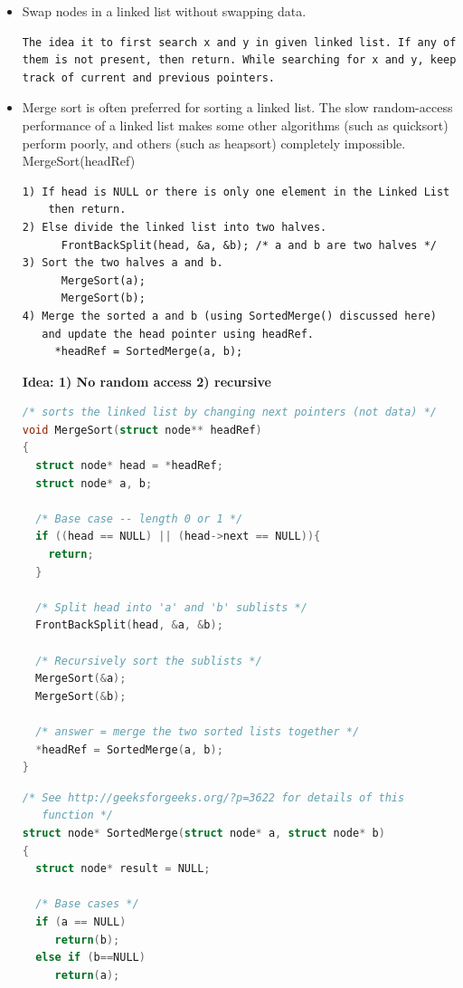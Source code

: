 \documentclass[a4paper,11pt,twoside]{book}
\begin{document}
\begin{itemize}
	\item Swap nodes in a linked list without swapping data. 
\begin{lstlisting}[breaklines]
The idea it to first search x and y in given linked list. If any of them is not present, then return. While searching for x and y, keep track of current and previous pointers.
\end{lstlisting}


	\item Merge sort is often preferred for sorting a linked list. The slow random-access performance of a linked list makes some other algorithms (such as quicksort) perform poorly, and others (such as heapsort) completely impossible. MergeSort(headRef)
\begin{verbatim}
1) If head is NULL or there is only one element in the Linked List 
    then return.
2) Else divide the linked list into two halves.  
      FrontBackSplit(head, &a, &b); /* a and b are two halves */
3) Sort the two halves a and b.
      MergeSort(a);
      MergeSort(b);
4) Merge the sorted a and b (using SortedMerge() discussed here) 
   and update the head pointer using headRef.
     *headRef = SortedMerge(a, b);
\end{verbatim}
\textbf{Idea: 1) No random access 2) recursive}

\begin{lstlisting}[frame=single, language=c++] 
/* sorts the linked list by changing next pointers (not data) */
void MergeSort(struct node** headRef)
{
  struct node* head = *headRef;
  struct node* a, b;
 
  /* Base case -- length 0 or 1 */
  if ((head == NULL) || (head->next == NULL)){
    return;
  }

  /* Split head into 'a' and 'b' sublists */
  FrontBackSplit(head, &a, &b); 
 
  /* Recursively sort the sublists */
  MergeSort(&a);
  MergeSort(&b);
 
  /* answer = merge the two sorted lists together */
  *headRef = SortedMerge(a, b);
}

\end{lstlisting}

 \begin{lstlisting}[frame=single, language=c++] 
/* See http://geeksforgeeks.org/?p=3622 for details of this 
   function */
struct node* SortedMerge(struct node* a, struct node* b)
{
  struct node* result = NULL;
 
  /* Base cases */
  if (a == NULL)
     return(b);
  else if (b==NULL)
     return(a);
 

\end{lstlisting}
\end{itemize}
\end{document}

